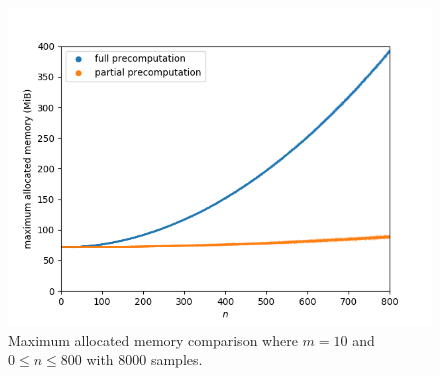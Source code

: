 \begin{figure}[H]
	\centering
	\includegraphics[scale=0.7]{figures/precomputation_memory_big}
	\caption{Maximum allocated memory comparison where $m=10$ and $0\leq n\leq 800$ with 8000 samples.}
\end{figure}